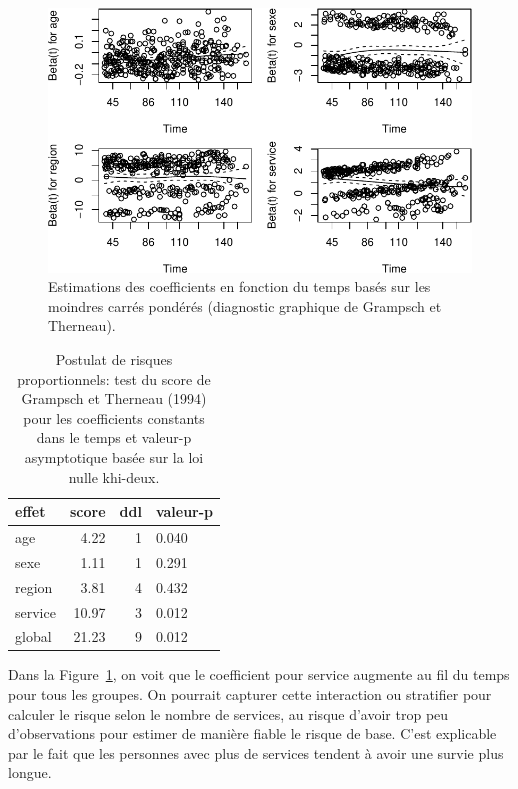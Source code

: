 \documentclass[
  11pt,
  letterpaper,
]{book}
\theoremstyle{definition}
\theoremstyle{remark}
\begin{document}
\begin{figure}[ht!]

{\centering \includegraphics{./06-survie_files/figure-pdf/fig-coxph-hypothese-1.pdf}

}

\caption{\label{fig-coxph-hypothese}Estimations des coefficients en
fonction du temps basés sur les moindres carrés pondérés (diagnostic
graphique de Grampsch et Therneau).}

\end{figure}

\hypertarget{tbl-coxph-hypothese}{}
\begin{table}
\caption{\label{tbl-coxph-hypothese}Postulat de risques proportionnels: test du score de Grampsch et
Therneau (1994) pour les coefficients constants dans le temps et
valeur-p asymptotique basée sur la loi nulle khi-deux. }\tabularnewline

\centering
\begin{tabular}{lrrl}
\toprule
effet & score & ddl & valeur-p\\
\midrule
age & 4.22 & 1 & 0.040\\
sexe & 1.11 & 1 & 0.291\\
region & 3.81 & 4 & 0.432\\
service & 10.97 & 3 & 0.012\\
global & 21.23 & 9 & 0.012\\
\bottomrule
\end{tabular}
\end{table}

Dans la Figure~\ref{fig-coxph-hypothese}, on voit que le coefficient
pour service augmente au fil du temps pour tous les groupes. On pourrait
capturer cette interaction ou stratifier pour calculer le risque selon
le nombre de services, au risque d'avoir trop peu d'observations pour
estimer de manière fiable le risque de base. C'est explicable par le
fait que les personnes avec plus de services tendent à avoir une survie
plus longue.
\end{document}
